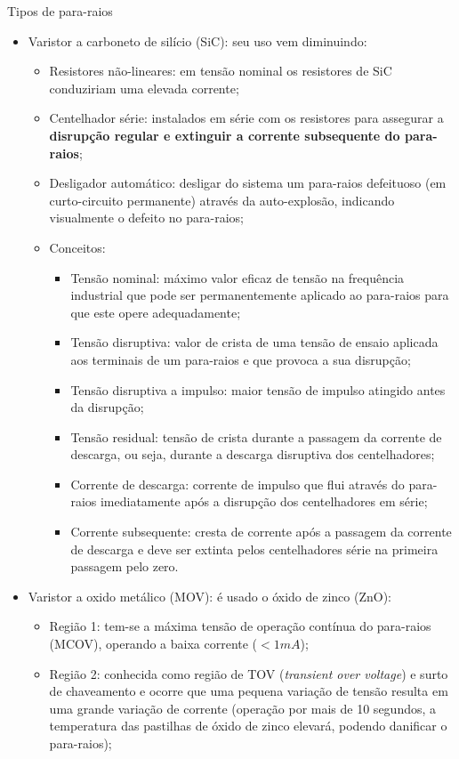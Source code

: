 Tipos de para-raios
\begin{itemize}
    \item Varistor a carboneto de silício (SiC): seu uso vem diminuindo:
    \begin{itemize}
        \item Resistores não-lineares: em tensão nominal os resistores de SiC conduziriam uma elevada corrente; 
        \item Centelhador série: instalados em série com os resistores para assegurar a \textbf{disrupção regular e extinguir a corrente subsequente do para-raios};
        \item Desligador automático: desligar do sistema um para-raios defeituoso (em curto-circuito permanente) através da auto-explosão, indicando visualmente o defeito no para-raios;
        \item Conceitos:
        \begin{itemize}
            \item Tensão nominal: máximo valor eficaz de tensão na frequência industrial que pode ser permanentemente aplicado ao para-raios para que este opere adequadamente;
            \item Tensão disruptiva: valor de crista de uma tensão de ensaio aplicada aos terminais de um para-raios e que provoca a sua disrupção;
            \item Tensão disruptiva a impulso: maior tensão de impulso atingido antes da disrupção;
            \item Tensão residual: tensão de crista durante a passagem da corrente de descarga, ou seja, durante a descarga disruptiva dos centelhadores;
            \item Corrente de descarga: corrente de impulso que flui através do para-raios imediatamente após a disrupção dos centelhadores em série;
            \item Corrente subsequente: cresta de corrente após a passagem da corrente de descarga e deve ser extinta pelos centelhadores série na primeira passagem pelo zero.
        \end{itemize}
    \end{itemize}
    \item Varistor a oxido metálico (MOV): é usado o óxido de zinco (ZnO):
    \begin{itemize}
        \item Região 1: tem-se a máxima tensão de operação contínua do para-raios (MCOV), operando a baixa corrente ($<1mA$);
        \item Região 2: conhecida como região de TOV (\textit{transient over voltage}) e surto de chaveamento e ocorre que uma pequena variação de tensão resulta em uma grande variação de corrente (operação por mais de 10 segundos, a temperatura das pastilhas de óxido de zinco elevará, podendo danificar o para-raios);

\end{itemize}
\end{itemize}
